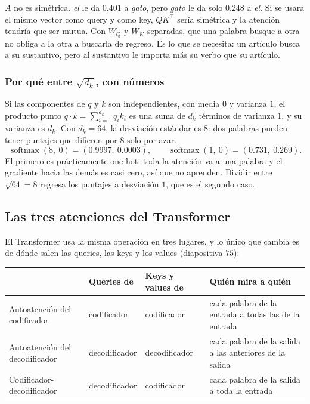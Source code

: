 \documentclass[11pt,letterpaper]{article}
\begin{document}
\begin{ojo}
    $A$ no es simétrica. \textit{el} le da $0.401$ a \textit{gato},
    pero \textit{gato} le da solo $0.248$ a \textit{el}. Si se usara el
    mismo vector como query y como key, $Q K^{\top}$ sería simétrica y
    la atención tendría que ser mutua. Con $W_Q$ y $W_K$ separadas, que
    una palabra busque a otra no obliga a la otra a buscarla de
    regreso. Es lo que se necesita: un artículo busca a su sustantivo,
    pero al sustantivo le importa más su verbo que su artículo.
\end{ojo}

\subsubsection*{Por qué entre $\sqrt{d_k}$, con números}

Si las componentes de $q$ y $k$ son independientes, con media $0$ y
varianza $1$, el producto punto $q \cdot k = \sum_{i=1}^{d_k} q_i k_i$
es una suma de $d_k$ términos de varianza $1$, y su varianza es $d_k$.
Con $d_k = 64$, la desviación estándar es $8$: dos palabras pueden
tener puntajes que difieren por $8$ solo por azar.
\[
    \operatorname{softmax}(8,\ 0) = (0.9997,\ 0.0003) ,
    \qquad
    \operatorname{softmax}(1,\ 0) = (0.731,\ 0.269) .
\]
El primero es prácticamente one-hot: toda la atención va a una
palabra y el gradiente hacia las demás es casi cero, así que no
aprenden. Dividir entre $\sqrt{64} = 8$ regresa los puntajes a
desviación $1$, que es el segundo caso.


\subsection*{Las tres atenciones del Transformer}

El Transformer usa la misma operación en tres lugares, y lo único que
cambia es de dónde salen las queries, las keys y los values
(diapositiva $75$):

\begin{center}
\small
\begin{tabular}{l>{\raggedright\arraybackslash}p{2.3cm}%
                 >{\raggedright\arraybackslash}p{2.3cm}%
                 >{\raggedright\arraybackslash}p{4.4cm}}
    \toprule
    & \textbf{Queries de} & \textbf{Keys y values de}
    & \textbf{Quién mira a quién} \\
    \midrule
    Autoatención del codificador & codificador & codificador
        & cada palabra de la entrada a todas las de la entrada \\
    Autoatención del decodificador & decodificador & decodificador
        & cada palabra de la salida a las anteriores de la salida \\
    Codificador-decodificador & decodificador & codificador
        & cada palabra de la salida a toda la entrada \\
    \bottomrule
\end{tabular}
\end{center}
\end{document}
